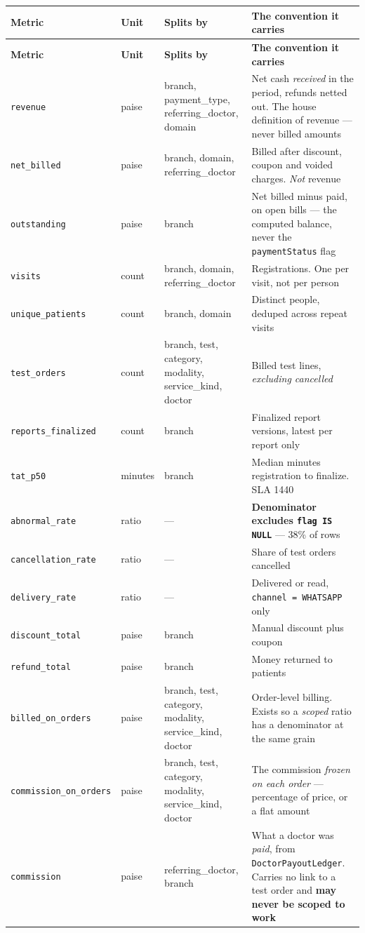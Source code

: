 \documentclass[11pt,a4paper]{report}
\newcommand{\code}[1]{\texttt{\small #1}}
\begin{document}
\begin{center}
\scriptsize
\begin{longtable}{@{}p{3.0cm}p{1.1cm}p{2.9cm}p{7.2cm}@{}}
\toprule
\textbf{Metric} & \textbf{Unit} & \textbf{Splits by} & \textbf{The convention it carries}\\
\midrule
\endfirsthead
\toprule
\textbf{Metric} & \textbf{Unit} & \textbf{Splits by} & \textbf{The convention it carries}\\
\midrule
\endhead
\code{revenue} & paise & branch, payment\_type, referring\_doctor, domain & Net cash \emph{received}
 in the period, refunds netted out. The house definition of revenue --- never billed amounts\\
\code{net\_billed} & paise & branch, domain, referring\_doctor & Billed after discount, coupon and
 voided charges. \emph{Not} revenue\\
\code{outstanding} & paise & branch & Net billed minus paid, on open bills --- the computed balance,
 never the \code{paymentStatus} flag\\
\code{visits} & count & branch, domain, referring\_doctor & Registrations. One per visit, not per
 person\\
\code{unique\_patients} & count & branch, domain & Distinct people, deduped across repeat visits\\
\code{test\_orders} & count & branch, test, category, modality, service\_kind, doctor & Billed test
 lines, \emph{excluding cancelled}\\
\code{reports\_finalized} & count & branch & Finalized report versions, latest per report only\\
\code{tat\_p50} & minutes & branch & Median minutes registration to finalize. SLA 1440\\
\code{abnormal\_rate} & ratio & --- & \textbf{Denominator excludes \code{flag IS NULL}} --- 38\% of
 rows\\
\code{cancellation\_rate} & ratio & --- & Share of test orders cancelled\\
\code{delivery\_rate} & ratio & --- & Delivered or read, \code{channel = WHATSAPP} only\\
\code{discount\_total} & paise & branch & Manual discount plus coupon\\
\code{refund\_total} & paise & branch & Money returned to patients\\
\code{billed\_on\_orders} & paise & branch, test, category, modality, service\_kind, doctor & Order-level
 billing. Exists so a \emph{scoped} ratio has a denominator at the same grain\\
\code{commission\_on\_orders} & paise & branch, test, category, modality, service\_kind, doctor & The
 commission \emph{frozen on each order} --- percentage of price, or a flat amount\\
\code{commission} & paise & referring\_doctor, branch & What a doctor was \emph{paid}, from
 \code{DoctorPayoutLedger}. Carries no link to a test order and \textbf{may never be scoped to
 work}\\
\bottomrule
\end{longtable}
\end{center}
\end{document}
